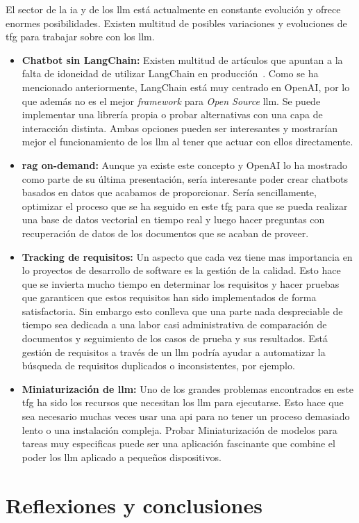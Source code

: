 El sector de la \acrlong{ia} y de los \acrlong{llm} está actualmente en constante evolución y ofrece enormes posibilidades. Existen multitud de posibles variaciones y evoluciones de \acrshort{tfg} para trabajar sobre con los \acrshort{llm}.

\begin{itemize}
    \item \textbf{Chatbot sin LangChain:} Existen multitud de artículos que apuntan a la falta de idoneidad de utilizar LangChain en producción~\cite{LangChainNot}. Como se ha mencionado anteriormente, LangChain está muy centrado en OpenAI, por lo que además no es el mejor \textit{framework} para \textit{Open Source} \acrshort{llm}. Se puede implementar una librería propia o probar alternativas con una capa de interacción distinta. Ambas opciones pueden ser interesantes y mostrarían mejor el funcionamiento de los \acrshort{llm} al tener que actuar con ellos directamente.

    \item \textbf{\acrshort{rag} on-demand:} Aunque ya existe este concepto y OpenAI lo ha mostrado como parte de su última presentación, sería interesante poder crear chatbots basados en datos que acabamos de proporcionar. Sería sencillamente, optimizar el proceso que se ha seguido en este \acrshort{tfg} para que se pueda realizar una base de datos vectorial en tiempo real y luego hacer preguntas con recuperación de datos de los documentos que se acaban de proveer.

    \item \textbf{Tracking de requisitos:} Un aspecto que cada vez tiene mas importancia en lo proyectos de desarrollo de software es la gestión de la calidad. Esto hace que se invierta mucho tiempo en determinar los requisitos y hacer pruebas que garanticen que estos requisitos han sido implementados de forma satisfactoria. Sin embargo esto conlleva que una parte nada despreciable de tiempo sea dedicada a una labor casi administrativa de comparación de documentos y seguimiento de los casos de prueba y sus resultados. Está gestión de requisitos a través de un \acrshort{llm} podría ayudar a automatizar la búsqueda de requisitos duplicados o inconsistentes, por ejemplo.

    \item \textbf{Miniaturización de \acrshort{llm}:} Uno de los grandes problemas encontrados en este \acrshort{tfg} ha sido los recursos que necesitan los \acrshort{llm} para ejecutarse. Esto hace que sea necesario muchas veces usar una \acrshort{api} para no tener un proceso demasiado lento o una instalación compleja. Probar Miniaturización de modelos para tareas muy especificas puede ser una aplicación fascinante que combine el poder los \acrshort{llm} aplicado a pequeños dispositivos.
\end{itemize}

\section{Reflexiones y conclusiones}
